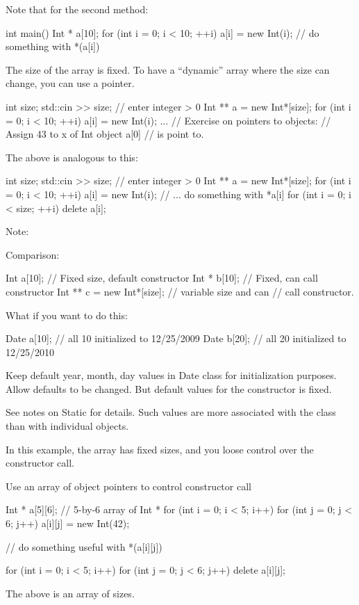 Note that for the second method:

\begin{console}
int main()
{   
    Int * a[10];
    for (int i = 0; i < 10; ++i)
        a[i] = new Int(i);
    // do something with *(a[i])
}
\end{console}
The size of the array is fixed. To have a ``dynamic'' array where the
size can change, you can use a pointer.
\begin{console}
int size;
std::cin >> size; // enter integer > 0
Int ** a = new Int*[size];
for (int i = 0; i < 10; ++i)
    a[i] = new Int(i);
...
// Exercise on pointers to objects:
// Assign 43 to x of Int object a[0]
// is point to.
\end{console}
The above is analogous to this:
\begin{console}
int size;
std::cin >> size; // enter integer > 0
Int ** a = new Int*[size];
for (int i = 0; i < 10; ++i)
    a[i] = new Int(i);
    // ... do something with *a[i]
for (int i = 0; i < size; ++i)
    delete a[i];
\end{console}
Note:
Comparison:
\begin{console}
Int a[10];        // Fixed size, default constructor
Int * b[10];      // Fixed, can call constructor
Int ** c = new Int*[size]; // variable size and can
                           // call constructor.
\end{console}
What if you want to do this:
\begin{console}
Date a[10]; // all 10 initialized to 12/25/2009
Date b[20]; // all 20 initialized to 12/25/2010
\end{console}
Keep default year, month, day values in Date class for initialization
purposes. Allow defaults to be changed. But default values for the
constructor is fixed.

See notes on Static for details. Such values are more associated with
the class than with individual objects.

In this example, the array has fixed sizes, and you loose control over
the constructor call.

Use an array of object pointers to control constructor call
\begin{console}
Int * a[5][6]; // 5-by-6 array of Int *
for (int i = 0; i < 5; i++)
    for (int j = 0; j < 6; j++)
        a[i][j] = new Int(42);

// do something useful with *(a[i][j])

for (int i = 0; i < 5; i++)
    for (int j = 0; j < 6; j++)
        delete a[i][j];
\end{console}
The above is an array of  sizes.


